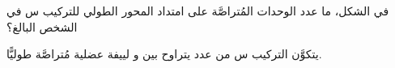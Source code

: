 
\begin{question}

\begin{instance}

\begin{frq}

\begin{stem}
في الشكل، ما عدد الوحدات المُتراصَّة على امتداد المحور الطولي للتركيب س في الشخص البالغ؟\par
{}
\end{stem}

\begin{answer}
يتكوَّن التركيب س من عدد يتراوح بين  و لييفة عضلية مُتراصَّة طوليًّا.\par

\end{answer}

\end{frq}

\end{instance}

\end{question}
